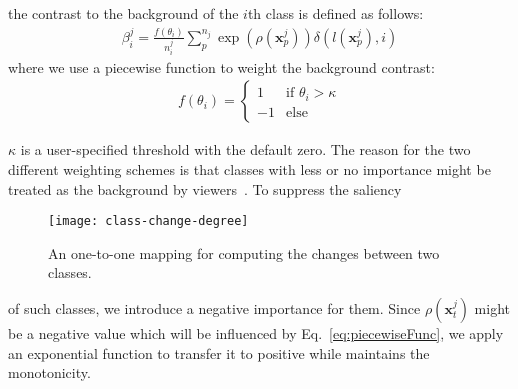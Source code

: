 the contrast to the background of the $i$th class is defined as follows:
\begin{align}\label{eq:ctbc}
 \beta^j_i = \frac{f(\theta_i)}{n^j_i}\sum^{n_j}_{p} \exp(\rho(\mathbf{x}^j_p)) \delta(l(\mathbf{x}^j_p),i)
\end{align}
where we use a piecewise function to weight the background contrast:
\begin{align}
f(\theta_i) =  \left\{ \begin{array}{ll}
1 & \textrm{if $\theta_i>\kappa$}\\
-1 & \textrm{else}
\end{array} \right.
\label{eq:piecewiseFunc}
\end{align}

$\kappa$ is a user-specified threshold with the default zero. The reason for the two different weighting schemes is that classes with less or no importance might be treated as the background by viewers~\cite{zhang2018review}. To suppress the saliency
\begin{wrapfigure}{r}{0.28\columnwidth}
	\vspace{-5mm}
	\centering
	\texttt{[image: class-change-degree]}
	\vspace*{-8mm}
	\caption{An one-to-one mapping for computing the changes between two classes.}
	\vspace*{-2mm}
	\label{fig:class-change-degree}
\end{wrapfigure}
 of such classes, we introduce a negative importance for them. Since $\rho (\mathbf{x}^j_t)$ might be a negative value which will be influenced by Eq.~\ref{eq:piecewiseFunc}, we apply an exponential function to transfer it to positive while maintains the monotonicity.

